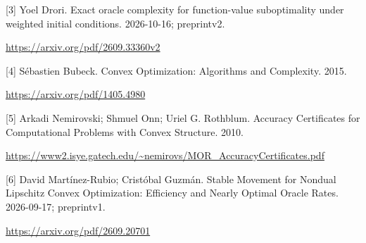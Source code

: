 \documentclass[10pt,a4paper]{article}
\begin{document}
[3] Yoel Drori. Exact oracle complexity for function-value suboptimality under weighted initial conditions. 2026-10-16; preprintv2.

\url{https://arxiv.org/pdf/2609.33360v2}

[4] Sébastien Bubeck. Convex Optimization: Algorithms and Complexity. 2015.

\url{https://arxiv.org/pdf/1405.4980}

[5] Arkadi Nemirovski; Shmuel Onn; Uriel G. Rothblum. Accuracy Certificates for Computational Problems with Convex Structure. 2010.

\url{https://www2.isye.gatech.edu/~nemirovs/MOR_AccuracyCertificates.pdf}

[6] David Martínez-Rubio; Cristóbal Guzmán. Stable Movement for Nondual Lipschitz Convex Optimization: Efficiency and Nearly Optimal Oracle Rates. 2026-09-17; preprintv1.

\url{https://arxiv.org/pdf/2609.20701}
\end{document}

